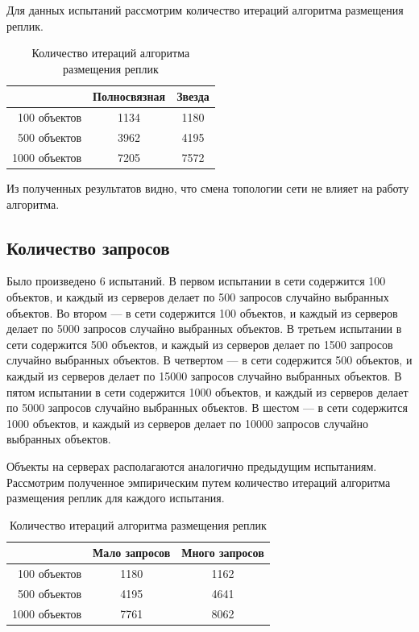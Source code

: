 			Для данных испытаний рассмотрим количество итераций алгоритма размещения реплик.

			\begin{table}[H]
				\small
				\centering
				\caption{Количество итераций алгоритма размещения реплик}
				\begin{tabular} {|r|c|c|}
					\hline
						& Полносвязная 	& Звезда \\
					\hline
	100 объектов		& 1134			& 1180   \\
	500 объектов		& 3962			& 4195   \\
	1000 объектов		& 7205			& 7572   \\
					\hline
				\end{tabular}
			\end{table}

			Из полученных результатов видно, что смена топологии сети не влияет на работу алгоритма.
			
		\subsection{Количество запросов}
			
		
			Было произведено 6 испытаний. В первом испытании в сети содержится 100 объектов, и каждый из серверов делает по 500 запросов случайно выбранных объектов. Во втором --- в сети 
			содержится 100 объектов, и каждый из серверов делает по 5000 запросов случайно выбранных объектов. В третьем испытании в сети содержится 500 объектов, и каждый из серверов делает 
			по 1500 запросов случайно выбранных объектов. В четвертом --- в сети содержится 500 объектов, и каждый из серверов делает по 15000 запросов случайно выбранных объектов. В пятом 
			испытании в сети содержится 1000 объектов, и каждый из серверов делает по 5000 запросов случайно выбранных объектов. В шестом --- в сети содержится 1000 объектов, и каждый из серверов 
			делает по 10000 запросов случайно выбранных объектов.
			
			Объекты на серверах располагаются аналогично предыдущим испытаниям. Рассмотрим полученное эмпирическим путем количество итераций алгоритма размещения реплик для каждого испытания.

			\begin{table}[H]
				\small
				\centering
				\caption{Количество итераций алгоритма размещения реплик}
				\begin{tabular} {|r|c|c|}
					\hline
						& Мало запросов & Много запросов \\
					\hline
	100 объектов		& 1180			& 1162 \\
	500 объектов		& 4195			& 4641 \\
	1000 объектов		& 7761			& 8062 \\
					\hline
				\end{tabular}
			\end{table}

